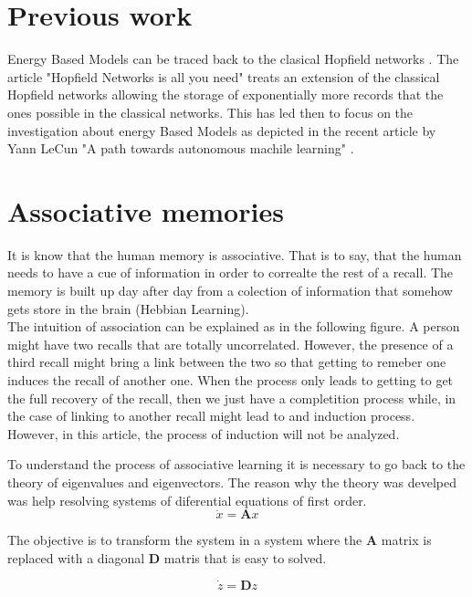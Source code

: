 \documentclass[journal]{IEEEtai}
\begin{document}
\section{Previous work}
Energy Based Models can be traced back to the clasical Hopfield networks \cite{Hopfield}. 
The article "Hopfield Networks is all you need"  treats an extension of the classical Hopfield networks allowing the storage of exponentially more records that the ones possible in the classical networks. This has led then to focus on the investigation about energy Based Models as depicted in the recent article by Yann LeCun "A path towards autonomous machile learning" \cite{Path}. 

\section{Associative memories}
It is know that the human memory is associative. That is to say, that the human needs to have a cue of information in order to correalte the rest of a recall. The memory is built up  day after day from a colection of information that somehow gets store in the brain (Hebbian Learning). \\


The intuition of association can be explained as in the following figure. A person might have two recalls that are totally uncorrelated. However, the presence of a third recall might bring a link between the two so that getting to remeber one induces the recall of another one. When the process only leads to getting to get the full recovery of the recall, then we just have a completition process while, in the case of linking to another recall might lead to and induction process.\\ However, in this article, the process of induction will not be analyzed.

To understand the process of associative learning it is necessary to go back to the theory of eigenvalues and eigenvectors. The reason why the theory was develped was help resolving systems of diferential equations of first order. 
\begin{equation}\label{equ1}
\dot{x}=\textbf{A}x
\end{equation}

The objective is to transform the system in a system where the \textbf{A} matrix is replaced with a diagonal \textbf{D} matris that is easy to solved.

\begin{equation}\label{equ2}
\dot{z}=\textbf{D}z
\end{equation}
\end{document}
